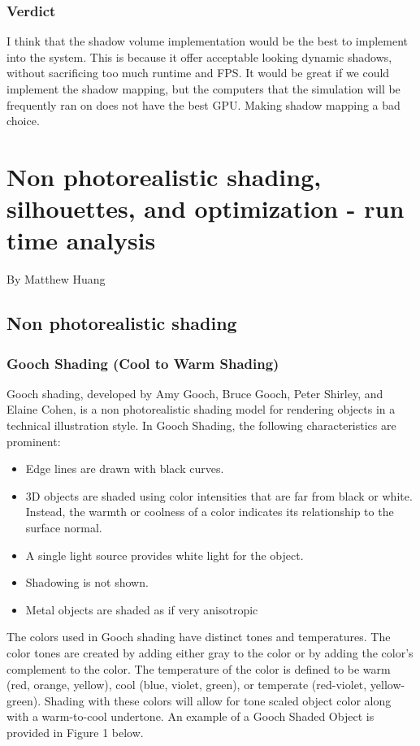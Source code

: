 \documentclass[10pt,journal,compsoc,draftclsnofoot]{IEEEtran}
\begin{document}
\subsubsection{Verdict}
I think that the shadow volume implementation would be the best to implement into the system.
This is because it offer acceptable looking dynamic shadows, without sacrificing too much runtime and FPS.
It would be great if we could implement the shadow mapping, but the computers that the simulation will be frequently ran on does not have the best GPU.
Making shadow mapping a bad choice.

\newpage

\section{Non photorealistic shading, silhouettes, and optimization - run time analysis}
\large{By Matthew Huang}
\normalsize
\subsection{Non photorealistic shading}

\subsubsection{Gooch Shading (Cool to Warm Shading)}
Gooch shading, developed by Amy Gooch, Bruce Gooch, Peter Shirley, and Elaine Cohen, is a non photorealistic shading model for rendering objects in a technical illustration style. \cite{gooch}
In Gooch Shading, the following characteristics are prominent:
\begin{itemize}
\item Edge lines are drawn with black curves.
\item 3D objects are shaded using color intensities that are far from black or white. Instead, the warmth or coolness of a color indicates its relationship to the surface normal.
\item A single light source provides white light for the object.
\item Shadowing is not shown.
\item Metal objects are shaded as if very anisotropic
\end{itemize}
The colors used in Gooch shading have distinct tones and temperatures.
The color tones are created by adding either gray to the color or by adding the color's complement to the color. The temperature of the color is defined to be warm (red, orange, yellow), cool (blue, violet, green), or temperate (red-violet, yellow-green). Shading with these colors will allow for tone scaled object color along with a warm-to-cool undertone. An example of a Gooch Shaded Object is provided in Figure 1 below. \cite{gooch2}
\end{document}

